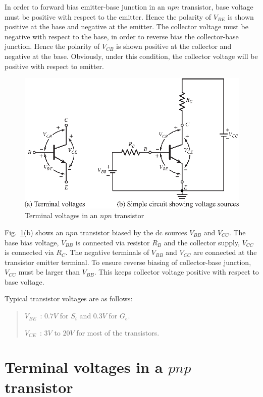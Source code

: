 In order to forward bias emitter-base junction in an $npn$ transistor, base voltage must be positive with respect to the emitter. Hence the polarity of $V_{BE}$ is shown positive at the base and negative at the emitter. The collector voltage must be negative with respect to the base, in order to reverse bias the collector-base junction. Hence the polarity of $V_{CB}$ is shown positive at the collector and negative at the base. Obviously, under this condition, the collector voltage will be positive with respect to emitter.
\begin{figure}[H]
\centering
\includegraphics{chap2/S3-EE-03-007.eps}
\caption{Terminal voltages in an $npn$ transistor}\label{fig3.10}
\end{figure}

Fig.~\ref{fig3.10}(b) shows an $npn$ transistor biased by the dc sources $V_{BB}$ and $V_{CC}$. The base bias voltage, $V_{BB}$ is connected via resistor $R_{B}$ and the collector supply, $V_{CC}$ is connected via $R_{C}$. The negative terminals of $V_{BB}$ and $V_{CC}$ are connected at the transistor emitter terminal. To ensure reverse biasing of collector-base junction, $V_{CC}$ must be larger than $V_{BB}$. This keeps collector voltage positive with respect to base voltage.

Typical transistor voltages are as follows:
\begin{quote}
$V_{BE}$~: $0.7V$ for $S_{i}$ and $0.3V$ for $G_{e}$.

$V_{CE}$~: $3V$ to $20V$ for most of the transistors.
\end{quote}

\section[Terminal voltages in a $pnp$ transistor]{Terminal voltages in a \boldmath$pnp$ transistor}\label{sec3.7}

